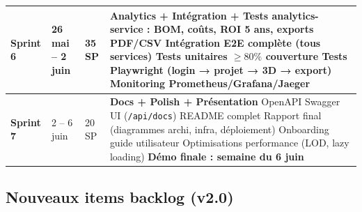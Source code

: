 \documentclass[12pt,a4paper]{article}
\begin{document}
\begin{tabularx}{\textwidth}{|l|l|l|X|}
\textbf{Sprint 6} & 26 mai -- 2 juin & 35 SP &
\textbf{Analytics + Intégration + Tests}
\newline analytics-service : BOM, coûts, ROI 5 ans, exports PDF/CSV
\newline Intégration E2E complète (tous services)
\newline Tests unitaires $\geq 80\%$ couverture
\newline Tests Playwright (login → projet → 3D → export)
\newline Monitoring Prometheus/Grafana/Jaeger \\
\hline
\rowcolor{tablerow}
\textbf{Sprint 7} & 2 -- 6 juin & 20 SP &
\textbf{Docs + Polish + Présentation}
\newline OpenAPI Swagger UI (\texttt{/api/docs})
\newline README complet
\newline Rapport final (diagrammes archi, infra, déploiement)
\newline Onboarding guide utilisateur
\newline Optimisations performance (LOD, lazy loading)
\newline \textbf{Démo finale : semaine du 6 juin} \\
\hline
\end{tabularx}

\subsection{Nouveaux items backlog (v2.0)}
\end{document}
